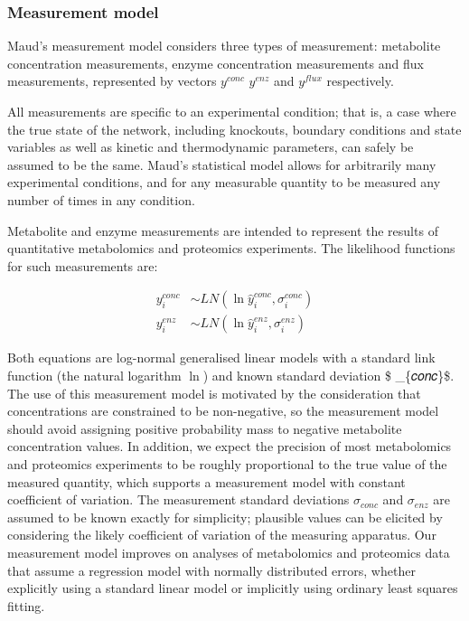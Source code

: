 \documentclass[journal=asbcd6,manuscript=article,layout=traditional]{achemso}
\begin{document}
\hypertarget{measurement-model}{%
\subsubsection{Measurement model}\label{measurement-model}}

Maud's measurement model considers three types of measurement:
metabolite concentration measurements, enzyme concentration measurements
and flux measurements, represented by vectors \(𝑦^{𝑐𝑜𝑛𝑐}\) \(𝑦^{𝑒𝑛𝑧}\)
and \(𝑦^{𝑓𝑙𝑢𝑥}\) respectively.

All measurements are specific to an experimental condition; that is, a
case where the true state of the network, including knockouts, boundary
conditions and state variables as well as kinetic and thermodynamic
parameters, can safely be assumed to be the same. Maud's statistical
model allows for arbitrarily many experimental conditions, and for any
measurable quantity to be measured any number of times in any condition.

Metabolite and enzyme measurements are intended to represent the results
of quantitative metabolomics and proteomics experiments. The likelihood
functions for such measurements are:

\begin{align}
y_i^{conc} &\sim LN(\ln{\hat{y}_i^{conc}}, \sigma_i^{conc})\label{eq-yconc} \\
y_i^{enz} &\sim LN(\ln{\hat{y}_i^{enz}}, \sigma_i^{enz})\label{eq-yenz}
\end{align}

Both equations are log-normal generalised linear models with a standard
link function (the natural logarithm \(\ln\)) and known standard
deviation \$ \sigma\_\{𝑐𝑜𝑛𝑐\}\$. The use of this measurement model is
motivated by the consideration that concentrations are constrained to be
non-negative, so the measurement model should avoid assigning positive
probability mass to negative metabolite concentration values. In
addition, we expect the precision of most metabolomics and proteomics
experiments to be roughly proportional to the true value of the measured
quantity, which supports a measurement model with constant coefficient
of variation. The measurement standard deviations \(\sigma_{𝑐𝑜𝑛𝑐}\) and
\(\sigma_{𝑒𝑛𝑧}\) are assumed to be known exactly for simplicity;
plausible values can be elicited by considering the likely coefficient
of variation of the measuring apparatus. Our measurement model improves
on analyses of metabolomics and proteomics data that assume a regression
model with normally distributed errors, whether explicitly using a
standard linear model or implicitly using ordinary least squares
fitting.
\end{document}
